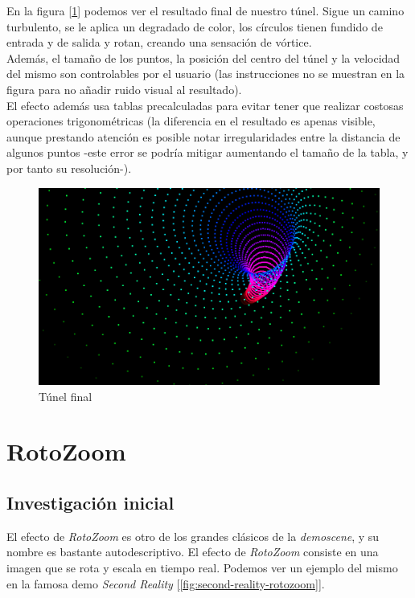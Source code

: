 En la figura [\ref{fig:finaltunnel}] podemos ver el resultado final de nuestro túnel. Sigue un camino turbulento, se le aplica un degradado de color, los círculos tienen fundido de entrada y de salida y rotan, creando una sensación de vórtice.\\

Además, el tamaño de los puntos, la posición del centro del túnel y la velocidad del mismo son controlables por el usuario (las instrucciones no se muestran en la figura para no añadir ruido visual al resultado).\\
 
El efecto además usa tablas precalculadas para evitar tener que realizar costosas operaciones trigonométricas (la diferencia en el resultado es apenas visible, aunque prestando atención es posible notar irregularidades entre la distancia de algunos puntos -este error se podría mitigar aumentando el tamaño de la tabla, y por tanto su resolución-). 

\begin{figure}[h]
	\centering
	\includegraphics[width=12cm]{archivos/finaltunnel}
	\caption{Túnel final}
	\label{fig:finaltunnel}
\end{figure}

\section{RotoZoom}

\subsection{Investigación inicial}

El efecto de \emph{RotoZoom} es otro de los grandes clásicos de la \emph{demoscene}, y su nombre es bastante autodescriptivo. El efecto de \emph{RotoZoom} consiste en una imagen que se rota y escala en tiempo real. Podemos ver un ejemplo del mismo en la famosa demo \emph{Second Reality} [\ref{fig:second-reality-rotozoom}].\\


